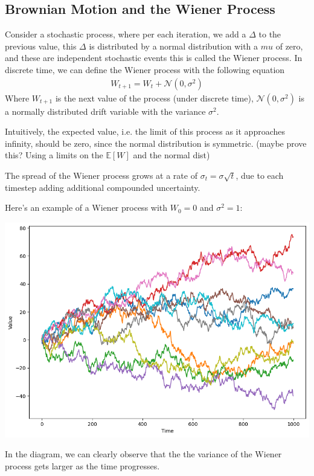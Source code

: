 \documentclass{article}
\begin{document}
\begin{spacing}{2.0}
\section{Brownian Motion and the Wiener Process}

Consider a stochastic process, where per each iteration, we add a $\Delta$ to the previous value,
this $\Delta$ is distributed by a normal distribution with a $mu$ of zero, and these are independent
stochastic events this is called the Wiener process. In discrete time, we can define the Wiener process
with the following equation
\begin{gather*}
    W_{t + 1} = W_{t} + \mathcal{N}(0, \sigma^{2})
\end{gather*}
Where $W_{t + 1}$ is the next value of the process (under discrete time), $\mathcal{N}(0, \sigma^{2})$
is a normally distributed drift variable with the variance $\sigma^{2}$.

Intuitively, the expected value, i.e. the limit of this process as it approaches infinity, should
be zero, since the normal distribution is symmetric. (maybe prove this? Using a limits on the $\mathbb{E}[W]$ and the normal dist)

The spread of the Wiener process grows at a rate of $\sigma_{t} = \sigma \sqrt{t}$, due to each timestep adding additional compounded uncertainty.

Here's an example of a Wiener process with $W_{0} = 0$ and $\sigma^{2} = 1$:
\begin{center}
    \includegraphics[scale=0.35]{./images/wiener.png}
\end{center}
In the diagram, we can clearly observe that the the variance of the Wiener process gets larger as the time progresses.


\end{spacing}
\end{document}
